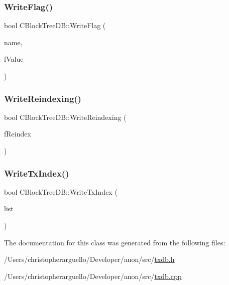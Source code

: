 \mbox{\label{class_c_block_tree_d_b_af2f65b70ac5d8a198d4f29a7e909c08a}} 
\subsubsection{\texorpdfstring{Write\+Flag()}{WriteFlag()}}
{\footnotesize\ttfamily bool C\+Block\+Tree\+D\+B\+::\+Write\+Flag (\begin{DoxyParamCaption}\item[{const std\+::string \&}]{name,  }\item[{bool}]{f\+Value }\end{DoxyParamCaption})}

\mbox{\label{class_c_block_tree_d_b_a8fa5d150b98f4fd1aa8cf503eddfccef}} 
\subsubsection{\texorpdfstring{Write\+Reindexing()}{WriteReindexing()}}
{\footnotesize\ttfamily bool C\+Block\+Tree\+D\+B\+::\+Write\+Reindexing (\begin{DoxyParamCaption}\item[{bool}]{f\+Reindex }\end{DoxyParamCaption})}

\mbox{\label{class_c_block_tree_d_b_a1e03745f9675ad352a1483a0aa7ef308}} 
\subsubsection{\texorpdfstring{Write\+Tx\+Index()}{WriteTxIndex()}}
{\footnotesize\ttfamily bool C\+Block\+Tree\+D\+B\+::\+Write\+Tx\+Index (\begin{DoxyParamCaption}\item[{const std\+::vector$<$ std\+::pair$<$ \mbox{\hyperlink{classuint256}{uint256}}, \mbox{\hyperlink{struct_c_disk_tx_pos}{C\+Disk\+Tx\+Pos}} $>$ $>$ \&}]{list }\end{DoxyParamCaption})}



The documentation for this class was generated from the following files\+:\begin{DoxyCompactItemize}
\item 
/\+Users/christopherarguello/\+Developer/anon/src/\mbox{\hyperlink{txdb_8h}{txdb.\+h}}\item 
/\+Users/christopherarguello/\+Developer/anon/src/\mbox{\hyperlink{txdb_8cpp}{txdb.\+cpp}}\end{DoxyCompactItemize}
